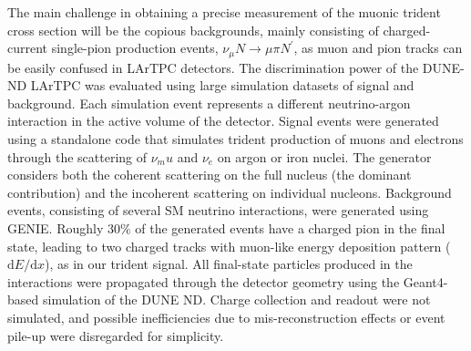 The main challenge in obtaining a precise measurement of the muonic trident cross section will be the copious backgrounds, mainly consisting of charged-current single-pion production events, $\nu_\mu N \to \mu \pi N^\prime$, as muon and pion tracks can be easily confused in LArTPC detectors. The discrimination power of the DUNE-ND LArTPC was evaluated using large simulation datasets of signal and background. Each simulation event represents a different neutrino-argon interaction in the active volume of the detector. Signal events were generated using a standalone code \cite{} that simulates trident production of muons and electrons through the scattering of $\nu_mu$ and $\nu_e$ on argon or iron nuclei. The generator considers both the coherent scattering on the full nucleus (the dominant contribution) and the incoherent scattering on individual nucleons. Background events, consisting of several SM neutrino interactions, were generated using GENIE. Roughly $30\%$ of the generated events have a charged pion in the final state, leading to two charged tracks with muon-like energy deposition pattern ($\mathrm{d}E/\mathrm{d}x$), as in our trident signal. All final-state particles produced in the interactions were propagated through the detector geometry using the Geant4-based \cite{Agostinelli:2002hh,Allison:2006ve,Allison:2016lfl} simulation of the DUNE ND. Charge collection and readout were not simulated, and possible inefficiencies due to mis-reconstruction effects or event pile-up were disregarded for simplicity.

